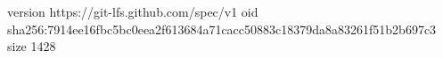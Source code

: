 version https://git-lfs.github.com/spec/v1
oid sha256:7914ee16fbc5bc0eea2f613684a71cacc50883c18379da8a83261f51b2b697c3
size 1428
